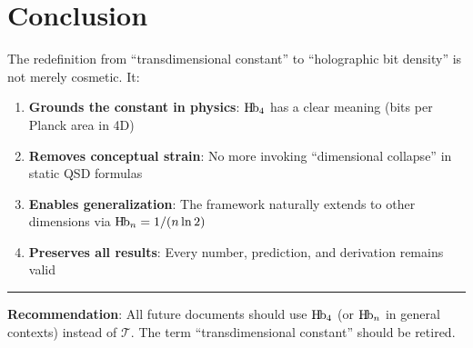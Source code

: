 \documentclass[11pt,a4paper]{article}
\newcommand{\Hb}{\textnormal{H\kern-0.12em b}}
\newcommand{\Hbn}{\Hb_n}
\newcommand{\Hbfour}{\Hb_4}
\newcommand{\Tc}{\mathcal{T}}
\begin{document}
\section{Conclusion}
\label{sec:conclusion}

The redefinition from ``transdimensional constant'' to ``holographic bit density'' is not merely cosmetic. It:

\begin{enumerate}
    \item \textbf{Grounds the constant in physics}: $\Hbfour$ has a clear meaning (bits per Planck area in 4D)
    
    \item \textbf{Removes conceptual strain}: No more invoking ``dimensional collapse'' in static QSD formulas
    
    \item \textbf{Enables generalization}: The framework naturally extends to other dimensions via $\Hbn = 1/(n\ln 2)$
    
    \item \textbf{Preserves all results}: Every number, prediction, and derivation remains valid
\end{enumerate}

\vspace{1em}
\hrule
\vspace{1em}

\textbf{Recommendation}: All future documents should use $\Hbfour$ (or $\Hbn$ in general contexts) instead of $\Tc$. The term ``transdimensional constant'' should be retired.
\end{document}
